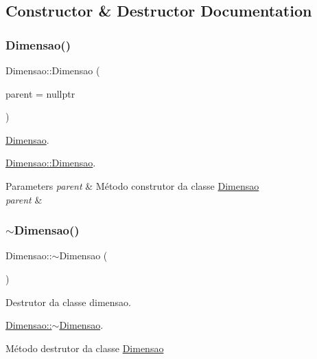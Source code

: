 \subsection{Constructor \& Destructor Documentation}
\mbox{\label{classDimensao_a628f34e3842d94b42fc81b30e5652705}} 
\subsubsection{\texorpdfstring{Dimensao()}{Dimensao()}}
{\footnotesize\ttfamily Dimensao\+::\+Dimensao (\begin{DoxyParamCaption}\item[{Q\+Widget $\ast$}]{parent = {\ttfamily nullptr} }\end{DoxyParamCaption})\hspace{0.3cm}{\ttfamily [explicit]}}



\mbox{\hyperlink{classDimensao}{Dimensao}}. 

\mbox{\hyperlink{classDimensao_a628f34e3842d94b42fc81b30e5652705}{Dimensao\+::\+Dimensao}}.


\begin{DoxyParams}{Parameters}
{\em parent} & Método construtor da classe \mbox{\hyperlink{classDimensao}{Dimensao}} \\
\hline
{\em parent} & \\
\hline
\end{DoxyParams}
\mbox{\label{classDimensao_a54ebe60ff8dcd6452aaa847dd328e8bd}} 
\subsubsection{\texorpdfstring{$\sim$Dimensao()}{~Dimensao()}}
{\footnotesize\ttfamily Dimensao\+::$\sim$\+Dimensao (\begin{DoxyParamCaption}{ }\end{DoxyParamCaption})}



Destrutor da classe dimensao. 

\mbox{\hyperlink{classDimensao_a54ebe60ff8dcd6452aaa847dd328e8bd}{Dimensao\+::$\sim$\+Dimensao}}.

Método destrutor da classe \mbox{\hyperlink{classDimensao}{Dimensao}} 

